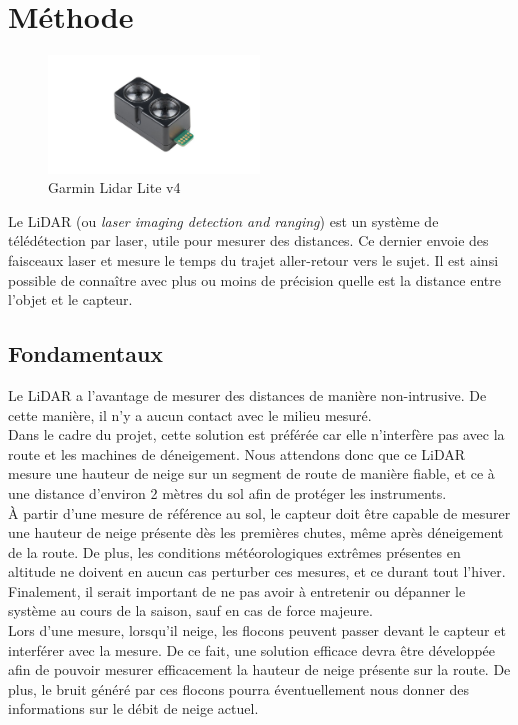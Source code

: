 \section{Méthode}

\begin{figure}[H]
    \centering
    \includegraphics[width=0.5\textwidth]{Images/LiDAR/GarminLiDARLiteV4.jpg}
    \caption{Garmin Lidar Lite v4}
    \label{fig:LiDARLiteV4}
\end{figure}

Le LiDAR (ou \emph{laser imaging detection and ranging}) est un système de télédétection par laser,
utile pour mesurer des distances. Ce dernier envoie des faisceaux laser et mesure le temps du trajet
aller-retour vers le sujet. Il est ainsi possible de connaître avec plus ou moins de précision
quelle est la distance entre l'objet et le capteur.

\subsection{Fondamentaux}
Le LiDAR a l'avantage de mesurer des distances de manière non-intrusive. De cette manière, il n'y a 
aucun contact avec le milieu mesuré.\\
Dans le cadre du projet, cette solution est préférée car elle n'interfère pas avec la route et les 
machines de déneigement. Nous attendons donc que ce LiDAR mesure une hauteur de neige sur un 
segment de route de manière fiable, et ce à une distance d'environ 2 mètres du sol afin de protéger 
les instruments.\\
À partir d'une mesure de référence au sol, le capteur doit être capable de mesurer une hauteur de neige
présente dès les premières chutes, même après déneigement de la route. De plus, les conditions
météorologiques extrêmes présentes en altitude ne doivent en aucun cas perturber ces mesures, et ce
durant tout l'hiver. Finalement, il serait important de ne pas avoir à entretenir ou dépanner le système
au cours de la saison, sauf en cas de force majeure.\\
Lors d'une mesure, lorsqu'il neige, les flocons peuvent passer devant le capteur et interférer avec la
mesure. De ce fait, une solution efficace devra être développée afin de pouvoir mesurer efficacement
la hauteur de neige présente sur la route. De plus, le bruit généré par ces flocons pourra éventuellement
nous donner des informations sur le débit de neige actuel.

